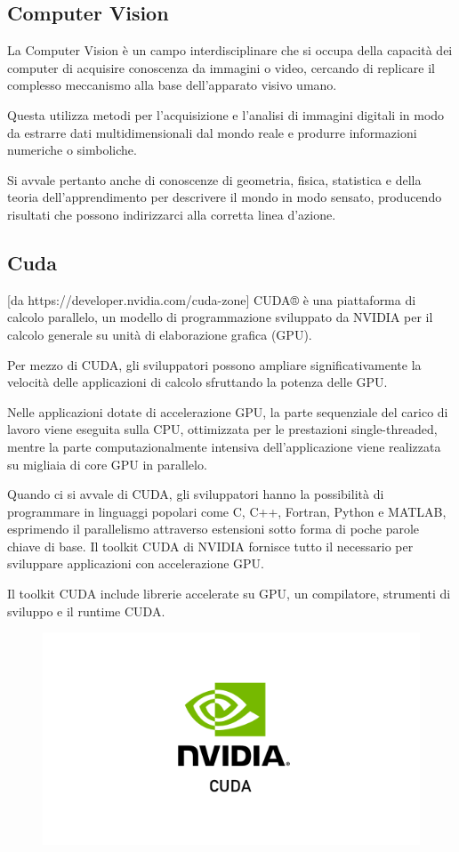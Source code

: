\subsection{Computer Vision}
La Computer Vision è un campo interdisciplinare che si occupa della capacità dei computer di acquisire conoscenza da immagini o video, cercando di replicare il complesso meccanismo alla base dell'apparato visivo umano. 

Questa utilizza metodi per l'acquisizione e l'analisi di immagini digitali in modo da estrarre dati multidimensionali dal mondo reale e produrre informazioni numeriche o simboliche. 

Si avvale pertanto anche di conoscenze di geometria, fisica, statistica e della teoria dell'apprendimento per descrivere il mondo in modo sensato, producendo risultati che possono indirizzarci alla corretta linea d'azione.

\subsection{Cuda}
[da https://developer.nvidia.com/cuda-zone]
CUDA® è una piattaforma di calcolo parallelo, un modello di programmazione sviluppato da NVIDIA per il calcolo generale su unità di elaborazione grafica (GPU). 

Per mezzo di CUDA, gli sviluppatori possono ampliare significativamente la velocità delle applicazioni di calcolo sfruttando la potenza delle GPU.

Nelle applicazioni dotate di accelerazione GPU, la parte sequenziale del carico di lavoro viene eseguita sulla CPU, ottimizzata per le prestazioni single-threaded, mentre la parte computazionalmente intensiva dell’applicazione viene realizzata su migliaia di core GPU in parallelo. 

Quando ci si avvale di CUDA, gli sviluppatori hanno la possibilità di programmare in linguaggi popolari come C, C++, Fortran, Python e MATLAB, esprimendo il parallelismo attraverso estensioni sotto forma di poche parole chiave di base.
Il toolkit CUDA di NVIDIA fornisce tutto il necessario per sviluppare applicazioni con accelerazione GPU.

Il toolkit CUDA include librerie accelerate su GPU, un compilatore, strumenti di sviluppo e il runtime CUDA.

\begin{figure}
    \begin{center}    
        \includegraphics[width=0.9\linewidth]{images/image1.png}
    \end{center}
\end{figure}

